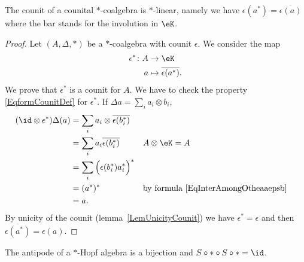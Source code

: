 \begin{lemma}       \label{LemcounitstarHopfalg}
	The counit of a counital \( *\)-coalgebra is \( *\)-linear, namely we have \( \epsilon(a^*)=\overline{ \epsilon(a) }\) where the bar stands for the involution in \( \eK\).
\end{lemma}

\begin{proof}
	Let \( (A,\Delta,*)\) be a \( *\)-coalgebra with counit \( \epsilon\). We consider the map
	\begin{equation}
		\begin{aligned}
			\epsilon^*\colon A & \to \eK                             \\
			a                  & \mapsto \overline{ \epsilon(a^*) }.
		\end{aligned}
	\end{equation}
	We prove that $\epsilon^*$ is a counit for \( A\). We have to check the property \eqref{EqformCounitDef} for \( \epsilon^*\). If \( \Delta a=\sum_ia_i\otimes b_i\),
	\begin{equation}
		\begin{aligned}[]
			(\id\otimes\epsilon^*)\Delta(a) & =\sum_ia_i\otimes\overline{ \epsilon(b_i^*) }                                                       \\
			                                & =\sum_ia_i\overline{ \epsilon(b_i^*) }        &  & A\otimes\eK=A                                    \\
			                                & =\sum_i\Big( \epsilon(b_i^*)a_i^* \Big)^*                                                           \\
			                                & =(a^*)^*                                      &  & \text{by formula \eqref{EqInterAmongOtheaaepsb}} \\
			                                & =a.
		\end{aligned}
	\end{equation}
	By unicity of the counit (lemma~\ref{LemUnicityCounit}) we have \( \epsilon^*=\epsilon\) and then \( \overline{ \epsilon(a^*) }=\epsilon(a)\).
\end{proof}

\begin{theorem}
	The antipode of a $*$-Hopf algebra is a bijection and \( S\circ *\circ S\circ *=\id\).
\end{theorem}

